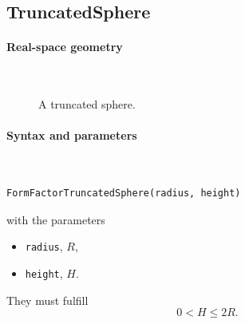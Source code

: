 \subsection{TruncatedSphere}\label{sec:TruncatedSphere}
  
\paragraph{Real-space geometry}\strut\\

\begin{figure}[H]
\hfill
{}
\hfill
{}
\hfill
{}
\hfill
\caption{A truncated sphere.}
\end{figure}
\FloatBarrier

\paragraph{Syntax and parameters}\strut\\[-2ex plus .2ex minus .2ex]
\begin{lstlisting}[language=python, style=eclipseboxed,numbers=none,nolol]
  FormFactorTruncatedSphere(radius, height)
\end{lstlisting}
with the parameters
\begin{itemize}
\item \texttt{radius}, $R$,
\item \texttt{height}, $H$.
\end{itemize}
They must fulfill
\begin{displaymath}
   0 < H\leq 2R.
\end{displaymath}


